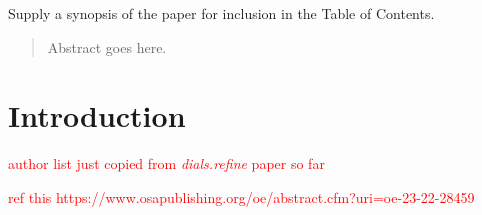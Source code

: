 \documentclass[preprint]{iucr}              %
\newcommand{\dialsrefine}{\emph{dials.refine}\xspace}
\newcommand\fixme[1]{\textcolor{red}{#1}}
\begin{document}




\maketitle                        %

\begin{synopsis}
Supply a synopsis of the paper for inclusion in the Table of Contents.
\end{synopsis}

\begin{abstract}
Abstract goes here.
\end{abstract}



\section{Introduction}

\fixme{author list just copied from \dialsrefine paper so far}

\fixme{ref this https://www.osapublishing.org/oe/abstract.cfm?uri=oe-23-22-28459}
\end{document}
